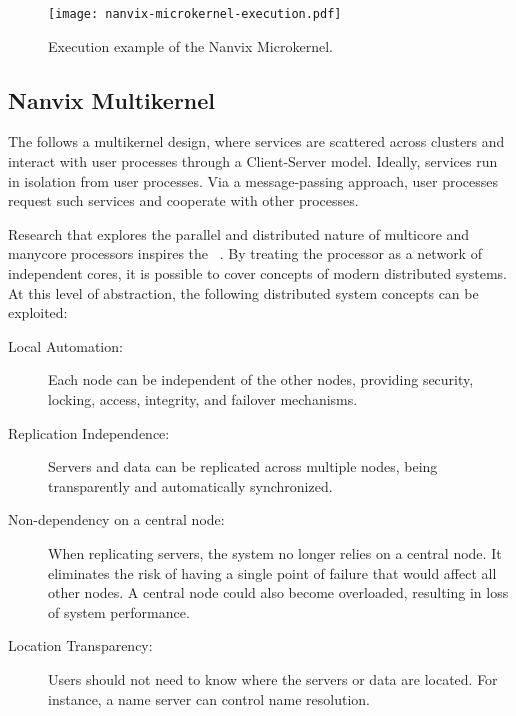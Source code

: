 		\begin{figure}[!tb]
			\centering%
			\caption{Execution example of the Nanvix Microkernel.}%
			\label{fig:microkernel-execution}%
			\texttt{[image: nanvix-microkernel-execution.pdf]}%
		\end{figure}

	\subsection{Nanvix Multikernel}
	\label{sec.multikernel}

		The \textit{\nanvixmultikernel} follows a multikernel design, where \os services
		are scattered across clusters and interact with user processes through a
		Client-Server model.
		Ideally, \os services run in isolation from user processes.
		Via a message-passing approach, user processes request such services and
		cooperate with other processes.

		Research that explores the parallel and distributed nature of multicore and
		manycore processors inspires the \nanvixmultikernel~\cite{wentzlaff_factored_2009, baumann_multikernel:_2009, Wisniewski2014}.
		By treating the processor as a network of independent cores, it is possible
		to cover concepts of modern distributed systems.
		At this level of abstraction, the following distributed system concepts can be exploited:

		\begin{description}

			\item[Local Automation:] Each node can be independent of the other nodes, providing
				security, locking, access, integrity, and failover mechanisms.

			\item[Replication Independence:] Servers and data can be replicated across multiple
				nodes, being transparently and automatically synchronized.

			\item[Non-dependency on a central node:] When replicating servers, the system no
				longer relies on a central node.
				It eliminates the risk of having a single point of failure that would affect all other nodes.
				A central node could also become overloaded, resulting in loss of system performance.

			\item[Location Transparency:] Users should not need to know where the servers
				or data are located. For instance, a name server can control name resolution.

		\end{description}

